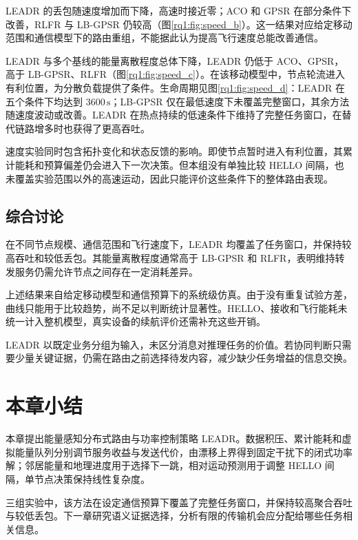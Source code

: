 LEADR 的丢包随速度增加而下降，高速时接近零；ACO 和 GPSR 在部分条件下改善，RLFR 与 LB-GPSR 仍较高（图\ref{rq1:fig:speed_b}）。这一结果对应给定移动范围和通信模型下的路由重组，不能据此认为提高飞行速度总能改善通信。

LEADR 与多个基线的能量离散程度总体下降，LEADR 仍低于 ACO、GPSR，高于 LB-GPSR、RLFR（图\ref{rq1:fig:speed_c}）。在该移动模型中，节点轮流进入有利位置，为分散负载提供了条件。生命周期见图\ref{rq1:fig:speed_d}：LEADR 在五个条件下均达到 $3600\,\mathrm{s}$；LB-GPSR 仅在最低速度下未覆盖完整窗口，其余方法随速度波动或改善。LEADR 在热点持续的低速条件下维持了完整任务窗口，在替代链路增多时也获得了更高吞吐。

速度实验同时包含拓扑变化和状态反馈的影响。即使节点暂时进入有利位置，其累计能耗和预算偏差仍会进入下一次决策。但本组没有单独比较 HELLO 间隔，也未覆盖实验范围以外的高速运动，因此只能评价这些条件下的整体路由表现。

\subsection{综合讨论}

在不同节点规模、通信范围和飞行速度下，LEADR 均覆盖了任务窗口，并保持较高吞吐和较低丢包。其能量离散程度通常高于 LB-GPSR 和 RLFR，表明维持转发服务仍需允许节点之间存在一定消耗差异。

上述结果来自给定移动模型和通信预算下的系统级仿真。由于没有重复试验方差，曲线只能用于比较趋势，尚不足以判断统计显著性。HELLO、接收和飞行能耗未统一计入整机模型，真实设备的续航评价还需补充这些开销。

LEADR 以既定业务分组为输入，未区分消息对推理任务的价值。若协同判断只需要少量关键证据，仍需在路由之前选择待发内容，减少缺少任务增益的信息交换。

\section{本章小结}

本章提出能量感知分布式路由与功率控制策略 LEADR。数据积压、累计能耗和虚拟能量队列分别调节服务收益与发送代价，由漂移上界得到固定干扰下的闭式功率解；邻居能量和地理进度用于选择下一跳，相对运动预测用于调整 HELLO 间隔，单节点决策保持线性复杂度。

三组实验中，该方法在设定通信预算下覆盖了完整任务窗口，并保持较高聚合吞吐与较低丢包。下一章研究语义证据选择，分析有限的传输机会应分配给哪些任务相关信息。
